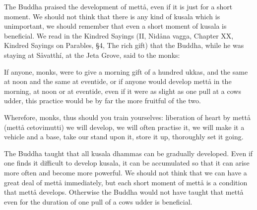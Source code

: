 \documentclass[12pt,twoside]{article}
\begin{document}
The Buddha praised the development of mett{\aa}, even if it is just for
a short moment. We should not think that there is any kind of kusala
which is unimportant, we should remember that even a short moment of
kusala is beneficial. We read in the Kindred Sayings (II, Nid{\aa}na
vagga, Chapter XX, Kindred Sayings on Parables, {\S}4, The rich gift)
that the Buddha, while he was staying at S{\aa}vatth\'i, at the Jeta
Grove, said to the monks:


\bigskip

If anyone, monks, were to give a morning gift of a hundred
{\textasciigrave}{\textasciigrave}ukkas{\textquotesingle}{\textquotesingle},
and the same at noon and the same at eventide, or if anyone would
develop mett{\aa} in the morning, at noon or at eventide, even if it
were as slight as one pull at a cow{\textquotesingle}s udder, this
practice would be by far the more fruitful of the two. 

Wherefore, monks, thus should you train yourselves: liberation of heart
by mett{\aa} (mett{\aa} cetovimutti) we will develop, we will often
practise it, we will make it a vehicle and a base, take our stand upon
it, store it up, thoroughly set it going. 


\bigskip

The Buddha taught that all kusala dhammas can be gradually developed.
Even if one finds it difficult to develop kusala, it can be accumulated
so that it can arise more often and become more powerful. We should not
think that we can have a great deal of mett{\aa} immediately, but each
short moment of mett{\aa} is a condition that mett{\aa} develops.
Otherwise the Buddha would not have taught that mett{\aa} even for the
duration of one pull of a cow{\textquotesingle}s udder is beneficial. 
\end{document}
